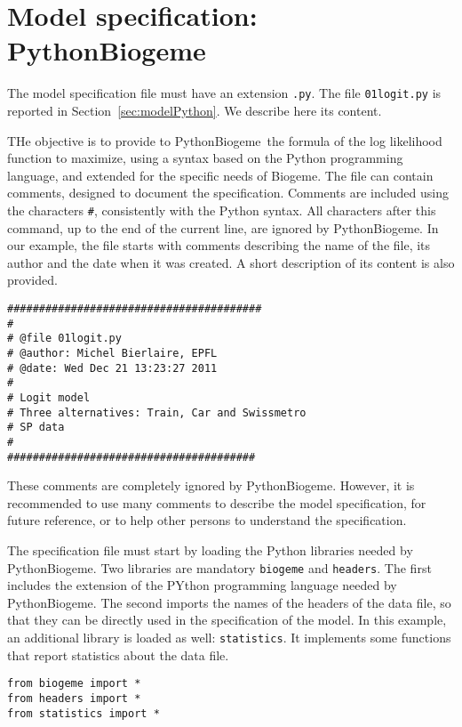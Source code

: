 \documentclass[12pt,a4paper]{article}
\newcommand{\PBIOGEME}{PythonBiogeme}
\newcommand{\BIOGEME}{Biogeme}
\begin{document}
\section{Model specification: \PBIOGEME}
\label{sec:mod}

The model specification file must have an extension \lstinline$.py$. 
The file \lstinline$01logit.py$ is reported in
Section~\ref{sec:modelPython}. We describe here its content. 

THe objective is to provide to \PBIOGEME\ the formula of the log
likelihood function to maximize, using a syntax based on the Python
programming language, and extended for the specific needs of \BIOGEME.
The file can
contain comments, designed to document the specification. 
Comments are included using the characters \verb+#+, consistently with
the Python syntax. All characters
after this command, up to the end of the current line, are ignored by \PBIOGEME.
In our example, the file starts with comments describing the name of
the file, its author and the date when it was created. A short
description of its content is also provided. 
\begin{lstlisting}[style=nonumbers]
########################################
#
# @file 01logit.py
# @author: Michel Bierlaire, EPFL
# @date: Wed Dec 21 13:23:27 2011
#
# Logit model
# Three alternatives: Train, Car and Swissmetro
# SP data
#
#######################################
\end{lstlisting}
These comments are
completely ignored by \PBIOGEME. However, it is recommended to use
many comments to describe the model specification, for future
reference, or to help other persons to understand the specification. 

The specification file must start by loading the Python libraries
needed by \PBIOGEME. Two libraries are mandatory \lstinline+biogeme+
and \lstinline+headers+. The first includes the extension of the
PYthon programming language needed by \PBIOGEME. The second imports
the names of the headers of the data file, so that they can be
directly used in the specification of the model. In this example, an
additional library is loaded as well: \lstinline+statistics+. It
implements some functions that report statistics about the data file. 

\begin{lstlisting}[style=nonumbers]
from biogeme import *
from headers import *
from statistics import *
\end{lstlisting}
\end{document}
